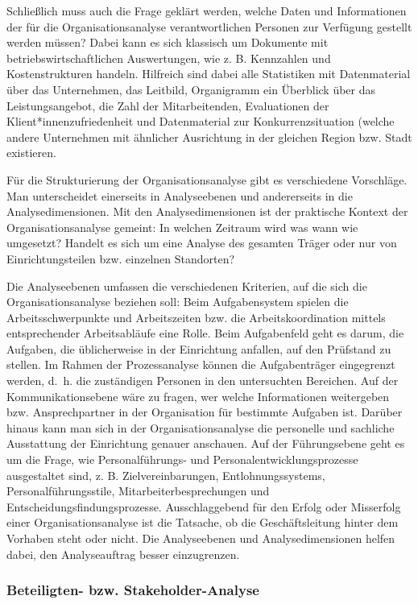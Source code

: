 \documentclass[
  letterpaper,
]{book}
\begin{document}
Schließlich muss auch die Frage geklärt werden, welche Daten und
Informationen der für die Organisationsanalyse verantwortlichen Personen
zur Verfügung gestellt werden müssen? Dabei kann es sich klassisch um
Dokumente mit betriebswirtschaftlichen Auswertungen, wie z. B.
Kennzahlen und Kostenstrukturen handeln. Hilfreich sind dabei alle
Statistiken mit Datenmaterial über das Unternehmen, das Leitbild,
Organigramm ein Überblick über das Leistungsangebot, die Zahl der
Mitarbeitenden, Evaluationen der Klient*innenzufriedenheit und
Datenmaterial zur Konkurrenzsituation (welche andere Unternehmen mit
ähnlicher Ausrichtung in der gleichen Region bzw. Stadt existieren.

Für die Strukturierung der Organisationsanalyse gibt es verschiedene
Vorschläge. Man unterscheidet einerseits in Analyseebenen und
andererseits in die Analysedimensionen. Mit den Analysedimensionen ist
der praktische Kontext der Organisationsanalyse gemeint: In welchen
Zeitraum wird was wann wie umgesetzt? Handelt es sich um eine Analyse
des gesamten Träger oder nur von Einrichtungsteilen bzw. einzelnen
Standorten?

Die Analyseebenen umfassen die verschiedenen Kriterien, auf die sich die
Organisationsanalyse beziehen soll: Beim Aufgabensystem spielen die
Arbeitsschwerpunkte und Arbeitszeiten bzw. die Arbeitskoordination
mittels entsprechender Arbeitsabläufe eine Rolle. Beim Aufgabenfeld geht
es darum, die Aufgaben, die üblicherweise in der Einrichtung anfallen,
auf den Prüfstand zu stellen. Im Rahmen der Prozessanalyse können die
Aufgabenträger eingegrenzt werden, d.~h. die zuständigen Personen in den
untersuchten Bereichen. Auf der Kommunikationsebene wäre zu fragen, wer
welche Informationen weitergeben bzw. Ansprechpartner in der
Organisation für bestimmte Aufgaben ist. Darüber hinaus kann man sich in
der Organisationsanalyse die personelle und sachliche Ausstattung der
Einrichtung genauer anschauen. Auf der Führungsebene geht es um die
Frage, wie Personalführungs- und Personalentwicklungsprozesse
ausgestaltet sind, z. B. Zielvereinbarungen, Entlohnungssystems,
Personalführungsstile, Mitarbeiterbesprechungen und
Entscheidungsfindungsprozesse. Ausschlaggebend für den Erfolg oder
Misserfolg einer Organisationsanalyse ist die Tatsache, ob die
Geschäftsleitung hinter dem Vorhaben steht oder nicht. Die Analyseebenen
und Analysedimensionen helfen dabei, den Analyseauftrag besser
einzugrenzen.

\subsubsection{Beteiligten- bzw.
Stakeholder-Analyse}\label{beteiligten--bzw.-stakeholder-analyse}
\end{document}
